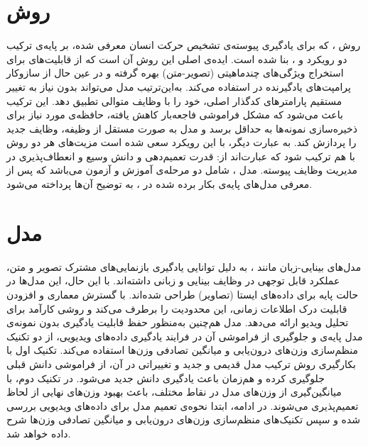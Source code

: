 \section{روش }
روش
،
که برای یادگیری پیوسته‌ی تشخیص حرکت انسان معرفی شده، بر پایه‌ی ترکیب دو رویکرد
و
،
بنا شده است. ایده‌ی اصلی این روش آن است که از قابلیت‌های  برای استخراج ویژگی‌های چندماهیتی (تصویر-متن) بهره گرفته و در عین حال از سازوکار پرامپت‌های یادگیرنده در  استفاده می‌کند. به‌این‌ترتیب مدل می‌تواند بدون نیاز به تغییر مستقیم پارامتر‌های کدگذار اصلی، خود را با وظایف متوالی تطبیق دهد. این ترکیب باعث می‌شود که مشکل فراموشی فاجعه‌بار کاهش یافته، حافظه‌ی مورد نیاز برای ذخیره‌سازی نمونه‌ها به حداقل برسد و مدل به صورت مستقل از وظیفه، وظایف جدید را پردازش کند. به عبارت دیگر، با این رویکرد سعی شده است مزیت‌های هر دو روش با هم ترکیب شود که عبارت‌اند از: قدرت تعمیم‌دهی و دانش وسیع  و انعطاف‌پذیری  در مدیریت وظایف پیوسته. مدل ، شامل دو مرحله‌‌ی آموزش  و آزمون می‌باشد که پس از معرفی مدل‌های پایه‌‌ی بکار برده شده در
،
به توضیح آن‌ها پرداخته می‌شود.

\section{مدل }
مدل‌های بینایی-زبان مانند ، به دلیل توانایی یادگیری بازنمایی‌های مشترک تصویر و متن، عملکرد قابل توجهی در وظایف بینایی و زبانی داشته‌اند. با این حال، این مدل‌ها در حالت پایه برای داده‌های ایستا (تصاویر) طراحی شده‌اند.  با گسترش معماری  و افزودن قابلیت درک اطلاعات زمانی، این محدودیت را برطرف می‌کند و روشی کارآمد برای تحلیل ویدیو ارائه می‌دهد. مدل
هم‌چنین به‌منظور حفظ قابلیت یادگیری بدون نمونه‌ی مدل پایه‌ی
و جلوگیری از فراموشی آن در فرایند یادگیری داده‌های ویدیویی، از دو تکنیک منظم‌سازی وزن‌های درون‌یابی  و میانگین تصادفی وزن‌ها  استفاده می‌کند. تکنیک اول با بکارگیری روش ترکیب مدل قدیمی و جدید و تغییراتی در آن، از فراموشی دانش قبلی جلوگیری کرده و هم‌زمان باعث یادگیری دانش جدید می‌شود. در تکنیک دوم، با میانگین‌گیری از وزن‌های مدل در نقاط مختلف، باعث بهبود وزن‌های نهایی از لحاظ تعمیم‌پذیری می‌شوند. در ادامه، ابتدا نحوه‌ی تعمیم مدل  برای داده‌های ویدیویی بررسی شده و سپس تکنیک‌های منظم‌سازی وزن‌های درون‌یابی و میانگین تصادفی وزن‌ها شرح داده خواهد شد. 

